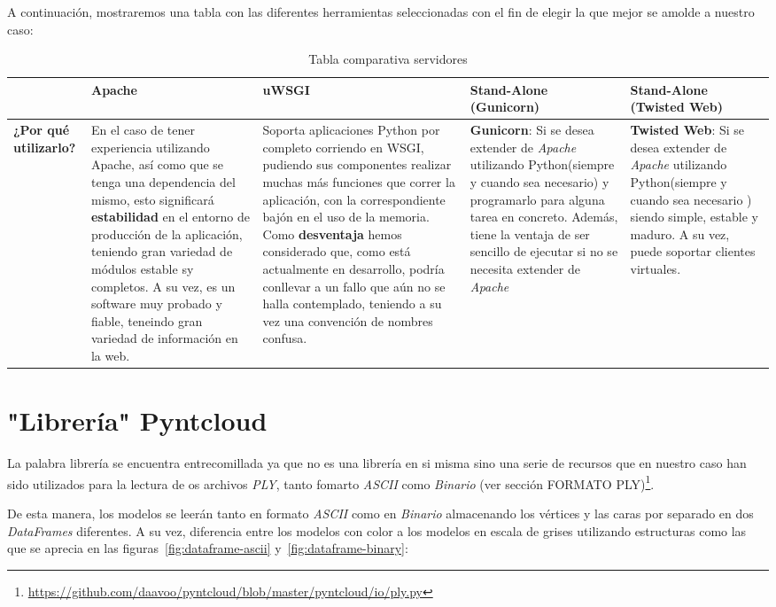 A continuación, mostraremos una tabla con las diferentes herramientas seleccionadas con el fin de elegir la que mejor se amolde a nuestro caso:

\begin{table}
	\centering
	\caption{Tabla comparativa servidores}
	\label{serverTable}
	\begin{tabular}{p{2.0cm} p{3.0cm} p{3.0cm} p{3.0cm} p{3.0cm}}
		\toprule
		  & \textbf{Apache} & \textbf{uWSGI} & \textbf{Stand-Alone (Gunicorn)} & \textbf{Stand-Alone (Twisted Web)} \\
		\midrule
		\textbf{¿Por qué utilizarlo?} & En el caso de tener experiencia utilizando Apache, así como que se tenga una dependencia del mismo, esto significará \textbf{estabilidad} en el entorno de producción de la aplicación, teniendo gran variedad de módulos estable sy completos. A su vez, es un software muy probado y fiable, teneindo gran variedad de información en la web. & Soporta aplicaciones Python por completo corriendo en WSGI, pudiendo sus componentes realizar muchas más funciones que correr la aplicación, con la correspondiente bajón en el uso de la memoria. Como \textbf{desventaja} hemos considerado que, como está actualmente en desarrollo, podría conllevar a un fallo que aún no se halla contemplado, teniendo a su vez una convención de nombres confusa. & \textbf{Gunicorn}: Si se desea extender de \textit{Apache} utilizando Python(siempre y cuando sea necesario) y programarlo para alguna tarea en concreto. Además, tiene la ventaja de ser sencillo de ejecutar si no se necesita extender de \textit{Apache} & \textbf{Twisted Web}: Si se desea extender de \textit{Apache} utilizando Python(siempre y cuando sea necesario ) siendo simple, estable y maduro. A su vez, puede soportar clientes virtuales.\\
		\bottomrule
	\end{tabular}
\end{table}

\section{"Librería" Pyntcloud}
La palabra librería se encuentra entrecomillada ya que no es una librería en si misma sino una serie de recursos que en nuestro caso han sido utilizados para la lectura de os archivos \textit{PLY}, tanto fomarto \textit{ASCII} como \textit{Binario} (ver sección FORMATO PLY)\footnote{\url{https://github.com/daavoo/pyntcloud/blob/master/pyntcloud/io/ply.py}}.

De esta manera, los modelos se leerán tanto en formato \textit{ASCII} como en \textit{Binario} almacenando los vértices y las caras por separado en dos \textit{DataFrames} diferentes. A su vez, diferencia entre los modelos con color a los modelos en escala de grises utilizando estructuras como las que se aprecia en las figuras~\ref{fig:dataframe-ascii} y~\ref{fig:dataframe-binary}:
